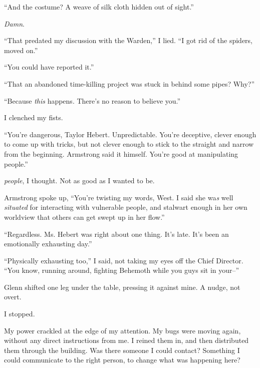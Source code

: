 ``And the costume?  A weave of silk cloth hidden out of sight.''



\emph{Damn}.



``That predated my discussion with the Warden,'' I lied.  ``I got rid of the spiders, moved on.''



``You could have reported it.''



``That an abandoned time-killing project was stuck in behind some pipes?  Why?''



``Because \emph{this} happens.  There's no reason to believe you.''



I clenched my fists.



``You're dangerous, Taylor Hebert.  Unpredictable.  You're deceptive, clever enough to come up with tricks, but not clever enough to stick to the straight and narrow from the beginning.  Armstrong said it himself.  You're good at manipulating people.''



\emph{\ldotsManipulating people}, I thought.  Not as good as I wanted to be.



Armstrong spoke up, ``You're twisting my words, West.  I said she wa\emph{s }well\emph{ situated }for interacting with vulnerable people, and stalwart enough in her own worldview that others can get swept up in her flow.''



``Regardless.  Ms. Hebert was right about one thing.  It's late.  It's been an emotionally exhausting day.''



``Physically exhausting too,'' I said, not taking my eyes off the Chief Director.  ``You know, running around, fighting Behemoth while you guys sit in your--''



Glenn shifted one leg under the table, pressing it against mine.  A nudge, not overt.



I stopped.



My power crackled at the edge of my attention.  My bugs were moving again, without any direct instructions from me.  I reined them in, and then distributed them through the building.  Was there someone I could contact?  Something I could communicate to the right person, to change what was happening here?



